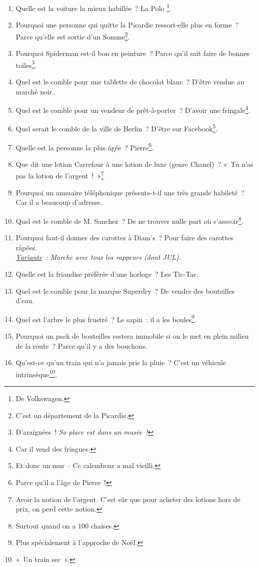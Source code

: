 \documentclass[10pt,a5paper,fullpage]{book}
\begin{document}
\begin{enumerate}
		\item Quelle est la voiture la mieux habillée~? La Polo \footnote{De Volkswagen.}.
		\item Pourquoi une personne qui quitte la Picardie ressort-elle plus en forme~? Parce qu'elle est sortie d'un Somme\footnote{C'est un département de la Picardie.}. 
		\item Pourquoi Spiderman est-il bon en peinture~? Parce qu’il sait faire de bonnes toiles\footnote{D'araignées~! \textit{Sa place est dans un musée~!}}.
		\item Quel est le comble pour une tablette de chocolat blanc~? D’être vendue au marché noir. 
		\item Quel est le comble pour un vendeur de prêt-à-porter~? D’avoir une fringale\footnote{Car il vend des fringues.}.
		\item Quel serait le comble de la ville de Berlin~? D'être sur Facebook\footnote{ Et donc un mur -- Ce calembour a mal vieilli.}. 
		\item Quelle est la personne la plus âgée~? Pierre\footnote{Parce qu’il a l’âge de Pierre~!}.
		\item Que dit une lotion Carrefour à une lotion de luxe (genre Chanel)~? «~Tu n’as pas la lotion de l’argent~!~»\footnote{Avoir la notion de l'argent. C'est sûr que pour acheter des lotions hors de prix, on perd cette notion.}
		\item Pourquoi un annuaire téléphonique présente-t-il une très grande habileté~? Car il a beaucoup d’adresse.
		\item Quel est le comble de M. Sanchez~? De ne trouver nulle part où s’asseoir\footnote{Surtout quand on a 100 chaises.}.
		\item Pourquoi faut-il donner des carottes à Diam’s~? Pour faire des carottes râpées. \\\textit{\underline{Variante}~: Marche avec tous les rappeurs (dont JUL).}
		\item Quelle est la friandise préférée d’une horloge~? Les Tic-Tac.
		\item Quel est le comble pour la marque Superdry~? De vendre des bouteilles d’eau. 
		\item Quel est l’arbre le plus frustré~? Le sapin~: il a les boules\footnote{Plus spécialement à l'approche de Noël.}.
		\item Pourquoi un pack de bouteilles restera immobile si on le met en plein milieu de la route~? Parce qu’il y a des bouchons. 
		\item Qu’est-ce qu’un train qui n’a jamais pris la pluie~? C’est un véhicule intrinsèque\footnote{«~Un train sec~».}.

\end{enumerate}
\end{document}
